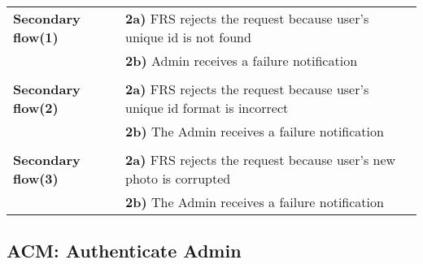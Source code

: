 \documentclass[a4paper,11pt]{article}
\begin{document}
\begin{tabular}{|p{3.5cm}|p{11.5cm}|}
    \\ \hline \rowcolor{Gray} & \\ \hline  
     
    \textbf{Secondary flow(1)} &  
    \textbf{2a)} FRS rejects the request because user's unique id is not found \\&
    \textbf{2b)} Admin receives a failure notification  
   
    \\ \hline \rowcolor{Gray} & \\ \hline  
   
    \textbf{Secondary flow(2)} &  
    \textbf{2a)} FRS rejects the request because user's unique id format is incorrect \\& 
    \textbf{2b)} The Admin receives a failure notification
   
    \\ \hline \rowcolor{Gray} & \\ \hline  
   
    \textbf{Secondary flow(3)} &  
    \textbf{2a)} FRS rejects the request because user's new photo is corrupted\\&
    \textbf{2b)} The Admin receives a failure notification 
    
    \\ \hline   
\end{tabular} 

\subsection{ACM: Authenticate Admin}
 
\end{document}
